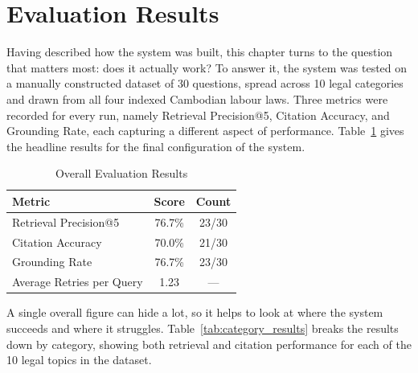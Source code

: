 \newpage


\section{Evaluation Results}

\hs Having described how the system was built, this chapter turns to the question that
matters most: does it actually work? To answer it, the system was tested on a manually
constructed dataset of 30 questions, spread across 10 legal categories and drawn from all
four indexed Cambodian labour laws. Three metrics were recorded for every run, namely
Retrieval Precision@5, Citation Accuracy, and Grounding Rate, each capturing a different
aspect of performance. Table~\ref{tab:overall_results} gives the headline results for the
final configuration of the system.

\begin{table}[H]
\centering
\caption{Overall Evaluation Results}
\label{tab:overall_results}
\begin{tabular}{lcc}
\toprule
\textbf{Metric} & \textbf{Score} & \textbf{Count} \\
\midrule
Retrieval Precision@5 & 76.7\% & 23/30 \\
Citation Accuracy     & 70.0\% & 21/30 \\
Grounding Rate        & 76.7\% & 23/30 \\
Average Retries per Query & 1.23 & --- \\
\bottomrule
\end{tabular}
\end{table}

\hs A single overall figure can hide a lot, so it helps to look at where the system
succeeds and where it struggles. Table~\ref{tab:category_results} breaks the results down
by category, showing both retrieval and citation performance for each of the 10 legal
topics in the dataset.

